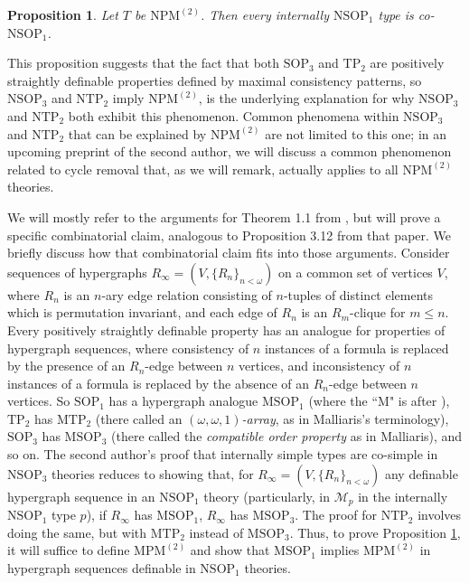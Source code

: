 \documentclass{article}
\newtheorem{proposition}{Proposition}
\theoremstyle{definition}
\theoremstyle{definition}
\theoremstyle{definition}
\begin{document}
\begin{proposition}\label{internally nsop1 types co-nsop1 in nmp2 theory}
    Let $T$ be $\mathrm{NPM}^{(2)}$. Then every internally $\mathrm{NSOP}_{1}$ type is co-$\mathrm{NSOP}_{1}$.
\end{proposition}

This proposition suggests that the fact that both $\mathrm{SOP}_{3}$ and $\mathrm{TP}_{2}$ are positively straightly definable properties defined by maximal consistency patterns, so $\mathrm{NSOP}_{3}$ and $\mathrm{NTP}_{2}$ imply $\mathrm{NPM}^{(2)}$, is the underlying explanation for why $\mathrm{NSOP}_{3}$ and $\mathrm{NTP}_{2}$ both exhibit this phenomenon. Common phenomena within $\mathrm{NSOP}_{3}$ and $\mathrm{NTP}_{2}$ that can be explained by $\mathrm{NPM}^{(2)}$ are not limited to this one; in an upcoming preprint of the second author, we will discuss a common phenomenon related to cycle removal that, as we will remark, actually applies to all $\mathrm{NPM}^{(2)}$ theories.

We will mostly refer to the arguments for Theorem 1.1 from \cite{mutchnik2023properties}, but will prove a specific combinatorial claim, analogous to Proposition 3.12 from that paper. We briefly discuss how that combinatorial claim fits into those arguments. Consider sequences of hypergraphs $R_{\infty}=(V,\{R_{n}\}_{n < \omega})$ on a common set of vertices $V$, where $R_{n}$ is an $n$-ary edge relation consisting of $n$-tuples of distinct elements which is permutation invariant, and each edge of $R_{n}$ is an $R_{m}$-clique for $m \leq n$. Every positively straightly definable property has an analogue for properties of hypergraph sequences, where consistency of $n$ instances of a formula is replaced by the presence of an $R_{n}$-edge between $n$ vertices, and inconsistency of $n$ instances of a formula is replaced by the absence of an $R_{n}$-edge between $n$ vertices. So $\mathrm{SOP}_{1}$ has a hypergraph analogue $\mathrm{MSOP}_{1}$ (where the ``$\mathrm{M}$" is after \cite{Mal10}), $\mathrm{TP}_{2}$ has $\mathrm{MTP}_{2}$ (there called an \textit{$(\omega, \omega, 1)$-array}, as in Malliaris's terminology), $\mathrm{SOP}_{3}$ has $\mathrm{MSOP}_{3}$ (there called the \textit{compatible order property} as in Malliaris), and so on. The second author's proof that internally simple types are co-simple in $\mathrm{NSOP}_{3}$ theories reduces to showing that, for $R_{\infty}=(V,\{R_{n}\}_{n < \omega})$ any definable hypergraph sequence in an $\mathrm{NSOP}_{1}$ theory (particularly, in $\mathcal{M}_{p}$ in the internally $\mathrm{NSOP}_{1}$ type $p$), if $R_{\infty}$ has $\mathrm{MSOP}_{1}$, $R_{\infty}$ has $\mathrm{MSOP}_{3}$. The proof for $\mathrm{NTP}_{2}$ involves doing the same, but with $\mathrm{MTP}_{2}$ instead of $\mathrm{MSOP}_{3}$. Thus, to prove Proposition \ref{internally nsop1 types co-nsop1 in nmp2 theory}, it will suffice to define $\mathrm{MPM}^{(2)}$ and show that $\mathrm{MSOP}_{1}$ implies $\mathrm{MPM}^{(2)}$ in hypergraph sequences definable in $\mathrm{NSOP}_{1}$ theories.
\end{document}
